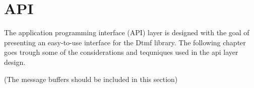 \chapter{API}
The application programming interface (API) layer is designed with the goal of presenting an easy-to-use interface for the Dtmf library. The following chapter goes trough some of the considerations and tequniques used in the api layer design.

(The message buffers should be included in this section)



















